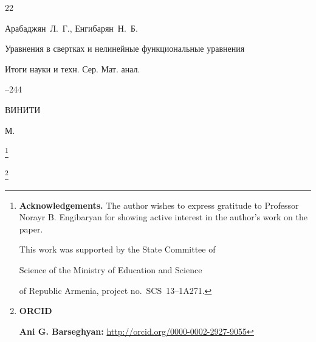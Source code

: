 \begin{thebibliography}{22}






\by Арабаджян~Л.~Г., Енгибарян~Н.~Б.

 \paper Уравнения в свертках и нелинейные функциональные уравнения

\serial Итоги науки и техн. Сер. Мат. анал.



--244

\publ ВИНИТИ

\publaddr М.













\end{thebibliography}



\RuDate





\bigskip



\makeentitle



\thanks{\textbf{Acknowledgements.} The author wishes to express gratitude to Professor Norayr B. Engibaryan for showing active interest in the author's work on the paper.

This work was supported by the State Committee of 

Science of the Ministry of Education and Science

of Republic Armenia, project no.~SCS~13--1A271.}





\thanks{{\bf ORCID}



{\bf Ani G. Barseghyan:}    \url{http://orcid.org/0000-0002-2927-9055}







}





